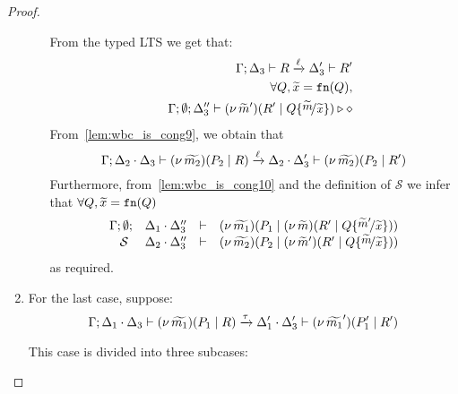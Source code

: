 \begin{proof}
\begin{enumerate}
\begin{enumerate}[i.]
					\noi From the typed LTS we get that:
					\begin{eqnarray}
						& &	\horel{\Gamma}{\Delta_3}{R}{\by{\ell}}{\Delta_3'}{R'}
							\label{lem:wbc_is_cong9} \\
						& &	\forall Q, \widetilde{x} = \fn{Q}, \nonumber\\
						& &	\Gamma; \emptyset; \Delta_3'' \proves \newsp{\widetilde{m}'}{R' \Par Q \subst{\widetilde{m}}{\widetilde{x}}} \hastype \Proc
							\label{lem:wbc_is_cong10}
					\end{eqnarray}
					\noi From~\eqref{lem:wbc_is_cong9}, we obtain that
					\[
						\Gamma; \Delta_2 \cdot \Delta_3 \vdash (\nu\, \widetilde{m_2})(P_2 \;|\; R) \xrightarrow{\ell} \Delta_2 \cdot \Delta_3' \vdash (\nu\, \widetilde{m_2})(P_2 \;|\; R')
					\]
					\noi Furthermore, from~\eqref{lem:wbc_is_cong10} and the definition of $\mathcal{S}$ we infer that
					$\forall Q, \widetilde{x} = \mathtt{fn}(Q)$
					\[
						\mhorel{\Gamma}{\Delta_1 \cat \Delta_3''}{\newsp{\widetilde{m_1}}{P_1 \Par \newsp{\widetilde{m}}{R' \Par Q \subst{\widetilde{m}'}{\widetilde{x}}}}}
						{\ \mathcal{S}\ }
						{\Delta_2 \cat \Delta_3''}{}{\newsp{\widetilde{m_2}}{P_2 \Par \newsp{\widetilde{m}'}{R' \Par Q \subst{\widetilde{m}}{\widetilde{x}}}}}
					\]
					\noi as required.
			\end{enumerate}


	\item For the last case, suppose:
			\[
				\Gamma; \Delta_1 \cdot \Delta_3 \vdash (\nu\, \widetilde{m_1})(P_1 \;|\; R) \xrightarrow{\tau} \Delta_1' \cdot \Delta_3' \vdash (\nu\, \widetilde{m_1}')(P_1' \;|\; R')
			\]

			\noi This case is divided into three subcases:

			\begin{enumerate}[i.]


\end{enumerate}
\end{enumerate}
\end{proof}
